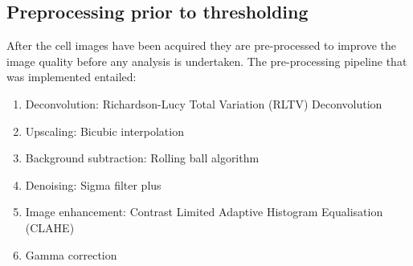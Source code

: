 \subsection{Preprocessing prior to thresholding}\label{sec:preprocess_applied}
After the cell images have been acquired they are pre-processed to improve the image quality before any analysis is undertaken. The pre-processing pipeline that was implemented entailed:
\begin{enumerate}
    \item Deconvolution: Richardson-Lucy Total Variation (RLTV) Deconvolution~\cite{DeconLab2, rltv}
    \item Upscaling: Bicubic interpolation
    \item Background subtraction: Rolling ball algorithm~\cite{rolling_ball}
    \item Denoising: Sigma filter plus~\cite{sigma_filter}
    \item Image enhancement: Contrast Limited Adaptive Histogram Equalisation (CLAHE)~\cite{clahe}
    \item Gamma correction
\end{enumerate}
